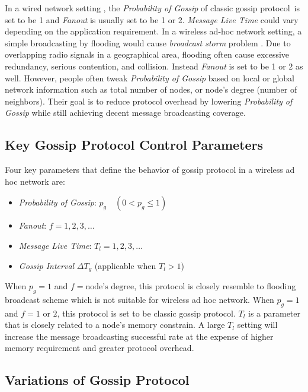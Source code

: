 \documentclass[onehalf,11pt]{beavtex}
\newcommand{\gp}{gossip protocol}
\newcommand{\pog}{Probability of Gossip}
\begin{document}
In a wired network setting , the \emph{\pog} of classic \gp ~is set to be 1 and \emph{Fanout} is usually set to be 1 or 2. \emph{Message Live Time} could vary depending on the application requirement. In a wireless ad-hoc network setting, a simple broadcasting by flooding would cause \emph{broadcast storm} problem \cite{tseng2002broadcast}. Due to overlapping radio signals in a geographical area, flooding often cause excessive redundancy, serious contention, and collision. Instead \emph{Fanout} is set to be 1 or 2 as well. However, people often tweak \emph{\pog} based on local or global network information such as total number of nodes, or node's degree (number of neighbors). Their goal is to reduce protocol overhead by lowering \emph{\pog} while still achieving decent message broadcasting coverage. 


\subsection{Key Gossip Protocol Control Parameters}
Four key parameters that define the behavior of gossip protocol in a wireless ad hoc network are: 

\begin{itemize}
	\item \emph{\pog}: $p_g  \quad (0 < p_g \leq 1)$
	\item \emph{Fanout}: $f = 1, 2, 3, \ldots$
	\item \emph{Message Live Time}: $T_l = 1,2,3, \ldots$
	\item \emph{Gossip Interval} $\Delta T_g$ (applicable when $T_l > 1$)
\end{itemize}

When $p_g = 1$ and $f = \mbox{node's degree}$, this protocol is closely resemble to flooding broadcast scheme which is not suitable for wireless ad hoc network. When $p_g = 1$ and $f = 1 \mbox{ or } 2$, this protocol is set to be classic \gp. $T_l$ is a parameter that is closely related to a node's memory constrain. A large $T_l$ setting will increase the message broadcasting successful rate at the expense of higher memory requirement and greater protocol overhead. 

\subsection{Variations of Gossip Protocol}
\end{document}
